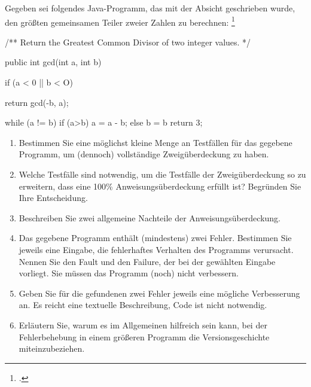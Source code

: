 \documentclass{lehramt-informatik-aufgabe}
\begin{document}

Gegeben sei folgendes Java-Programm, das mit der Absicht geschrieben
wurde, den größten gemeinsamen Teiler zweier Zahlen zu berechnen:
\footcite{examen:66116:2020:09}

\begin{liJavaAngabe}
/** Return the Greatest Common Divisor of two integer values. */

public int gcd(int a, int b) {
  if (a < 0 || b < O) {
  return gcd(-b, a);

  }
  while (a != b) {
    if (a>b){
      a = a - b;
    } else {
      b = b %
    }
  }
  return 3;
}
\end{liJavaAngabe}

\begin{enumerate}


\item Bestimmen Sie eine möglichst kleine Menge an Testfällen für das
gegebene Programm, um (dennoch) vollständige Zweigüberdeckung zu haben.


\item Welche Testfälle sind notwendig, um die Testfälle der
Zweigüberdeckung so zu erweitern, dass eine 100\% Anweisungsüberdeckung
erfüllt ist? Begründen Sie Ihre Entscheidung.


\item Beschreiben Sie zwei allgemeine Nachteile der
Anweisungsüberdeckung.


\item Das gegebene Programm enthält (mindestens) zwei Fehler. Bestimmen
Sie jeweils eine Eingabe, die fehlerhaftes Verhalten des Programms
verursacht. Nennen Sie den Fault und den Failure, der bei der gewählten
Eingabe vorliegt. Sie müssen das Programm (noch) nicht verbessern.


\item Geben Sie für die gefundenen zwei Fehler jeweils eine mögliche
Verbesserung an. Es reicht eine textuelle Beschreibung, Code ist nicht
notwendig.


\item Erläutern Sie, warum es im Allgemeinen hilfreich sein kann, bei
der Fehlerbehebung in einem größeren Programm die Versionsgeschichte
miteinzubeziehen.
\end{enumerate}
\end{document}

